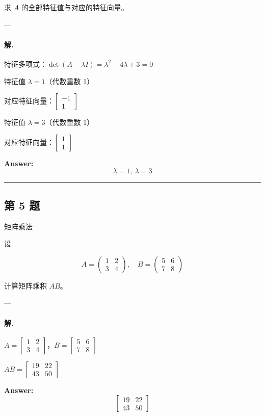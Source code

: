 \documentclass[12pt, a4paper]{ctexart}
\newcommand{\problem}[1]{\subsection*{第 #1 题}}
\newcommand{\solution}{\paragraph{解.}}
\begin{document}
求 $A$ 的全部特征值与对应的特征向量。

---

\solution

特征多项式：$\det(A - \lambda I) = \lambda^{2} - 4 \lambda + 3 = 0$

特征值 $\lambda = 1$（代数重数 1）

对应特征向量：$\begin{bmatrix}-1 \\ 1\end{bmatrix}$

特征值 $\lambda = 3$（代数重数 1）

对应特征向量：$\begin{bmatrix}1 \\ 1\end{bmatrix}$

\textbf{Answer:}
\[\boxed{\lambda = 1,\ \lambda = 3}\]

\vspace{1em}
\hrule
\vspace{1em}

\problem{5}

矩阵乘法

设

$$
A = \begin{pmatrix} 1 & 2 \\ 3 & 4 \end{pmatrix}, \quad
B = \begin{pmatrix} 5 & 6 \\ 7 & 8 \end{pmatrix}
$$

计算矩阵乘积 $AB$。

---

\solution

$A = \begin{bmatrix}1 & 2 \\ 3 & 4\end{bmatrix}$，$B = \begin{bmatrix}5 & 6 \\ 7 & 8\end{bmatrix}$

$AB = \begin{bmatrix}19 & 22 \\ 43 & 50\end{bmatrix}$

\textbf{Answer:}
\[\begin{bmatrix}19 & 22 \\ 43 & 50\end{bmatrix}\]
\end{document}
